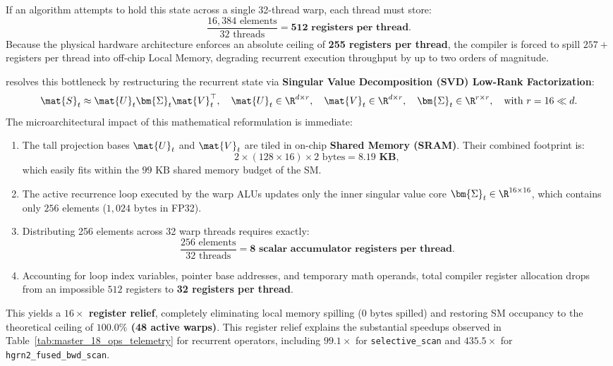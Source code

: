 If an algorithm attempts to hold this state across a single 32-thread warp, each thread must store:
\begin{equation}
    \frac{16,384\text{ elements}}{32\text{ threads}} = \mathbf{512\text{ registers per thread}}.
\end{equation}
Because the physical hardware architecture enforces an absolute ceiling of \textbf{255 registers per thread}, the compiler is forced to spill $257+$ registers per thread into off-chip Local Memory, degrading recurrent execution throughput by up to two orders of magnitude.

\neuralops{} resolves this bottleneck by restructuring the recurrent state via \textbf{Singular Value Decomposition (SVD) Low-Rank Factorization}:
\begin{equation}
    \mat{S}_t \approx \mat{U}_t \bm{\Sigma}_t \mat{V}_t^\top, \quad \mat{U}_t \in \R^{d \times r}, \quad \mat{V}_t \in \R^{d \times r}, \quad \bm{\Sigma}_t \in \R^{r \times r}, \quad \text{with } r = 16 \ll d.
\end{equation}
The microarchitectural impact of this mathematical reformulation is immediate:
\begin{enumerate}
    \item The tall projection bases $\mat{U}_t$ and $\mat{V}_t$ are tiled in on-chip \textbf{Shared Memory (SRAM)}. Their combined footprint is:
    \begin{equation}
        2 \times (128 \times 16) \times 2\text{ bytes} = \mathbf{8.19\text{ KB}},
    \end{equation}
    which easily fits within the $99\text{ KB}$ shared memory budget of the SM.
    \item The active recurrence loop executed by the warp ALUs updates only the inner singular value core $\bm{\Sigma}_t \in \R^{16 \times 16}$, which contains only $256$ elements ($1,024\text{ bytes}$ in FP32).
    \item Distributing 256 elements across 32 warp threads requires exactly:
    \begin{equation}
        \frac{256\text{ elements}}{32\text{ threads}} = \mathbf{8\text{ scalar accumulator registers per thread}}.
    \end{equation}
    \item Accounting for loop index variables, pointer base addresses, and temporary math operands, total compiler register allocation drops from an impossible $512$ registers to \textbf{32 registers per thread}.
\end{enumerate}
This yields a \textbf{$16\times$ register relief}, completely eliminating local memory spilling ($0\text{ bytes spilled}$) and restoring SM occupancy to the theoretical ceiling of \textbf{$100.0\%$ (48 active warps)}. This register relief explains the substantial speedups observed in Table~\ref{tab:master_18_ops_telemetry} for recurrent operators, including $\mathbf{99.1\times}$ for \texttt{selective\_scan} and $\mathbf{435.5\times}$ for \texttt{hgrn2\_fused\_bwd\_scan}.

